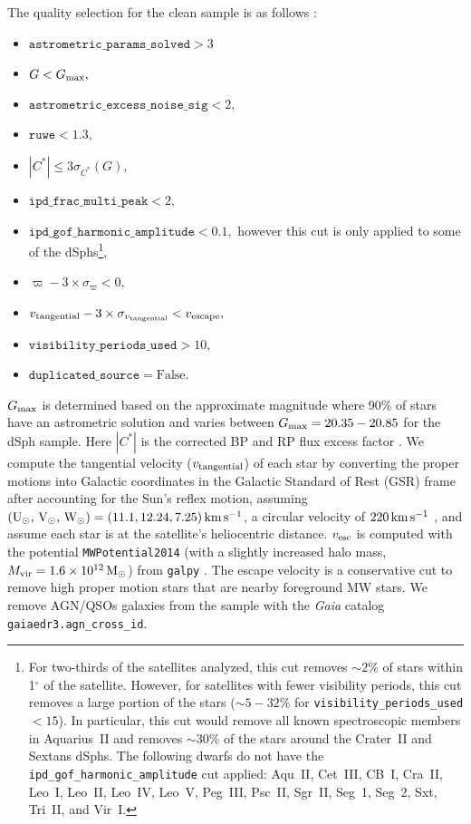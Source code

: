 \documentclass[twocolumn]{aastex63}
\begin{document}
The  quality selection for the clean sample is as follows \citep{Gaia_Lindegren_2021A&A...649A...2L, Gaia_Riello2021A&A...649A...3R}:
\begin{itemize}
    \item $\texttt{astrometric\_params\_solved} >3$
    \item $G<G_{\rm max},$
    \item $\texttt{astrometric\_excess\_noise\_sig} <2,$
    \item $ \texttt{ruwe} <1.3,$
    \item $|C^*| \le 3 \sigma_{C^*}(G),$
    \item $\texttt{ipd\_frac\_multi\_peak} <2,$
    \item $\texttt{ipd\_gof\_harmonic\_amplitude} <0.1,$ however this cut is only applied to some of the dSphs\footnote{For two-thirds of the satellites analyzed, this cut  removes $\sim2$\% of stars within 1$^{\circ}$ of the satellite.  However, for satellites with fewer visibility periods, this cut  removes a large portion of the  stars ($\sim5-32$\% for \texttt{visibility\_periods\_used}$<15$).  In particular, this cut would remove all known spectroscopic members in Aquarius~II and removes $\sim30$\% of the stars around the Crater~II and Sextans dSphs. The following dwarfs do not have the \texttt{ipd\_gof\_harmonic\_amplitude} cut applied: Aqu~II, Cet~III, CB~I, Cra~II, Leo~I, Leo~II, Leo~IV, Leo~V, Peg~III, Psc~II, Sgr~II, Seg~1, Seg~2, Sxt, Tri~II, and Vir~I. },
    \item $\varpi - 3 \times \sigma_\varpi < 0,$
    \item $v_{\rm tangential} - 3 \times \sigma_{v_{\rm tangential}} < v_{\rm escape},$
    \item $\texttt{visibility\_periods\_used}>10,$
    \item $\texttt{duplicated\_source}=\mathrm{False}.$
\end{itemize}
$G_{\rm max}$ is determined based on the approximate magnitude where 90\% of stars have an astrometric solution and varies between $G_{\rm max}=20.35-20.85$ for the dSph sample. 
{Here $|C^*|$ is  the corrected BP and RP flux excess factor \citep[see Equation 6 of][]{Gaia_Riello2021A&A...649A...3R}.}
We compute the tangential velocity ($v_{\rm tangential}$)   of each star by converting the proper motions into Galactic coordinates in the Galactic Standard of Rest (GSR) frame after accounting for the Sun's reflex motion, assuming $({\rm U_\odot,\, V_\odot, \, W_\odot}) = (11.1, 12.24, 7.25)\mathrm{\,km} \mathrm{\,s}^{-1}$, a circular velocity of $220\mathrm{\,km} \mathrm{\,s}^{-1}$ \citep{Schonrich2010MNRAS.403.1829S}, and assume each star is at the satellite's heliocentric distance.
$v_{\rm esc}$ is computed with the potential \texttt{MWPotential2014} (with a slightly increased halo mass, $M_{\rm vir}=1.6\times 10^{12} \mathrm{\,M_\odot}$) from \texttt{galpy} \citep{Bovy2015ApJS..216...29B}.
The escape velocity is a conservative cut to remove high proper motion stars that are nearby foreground MW stars. 
We remove AGN/QSOs galaxies from the sample with the {\it Gaia} catalog \texttt{gaiaedr3.agn\_cross\_id}.
\end{document}
